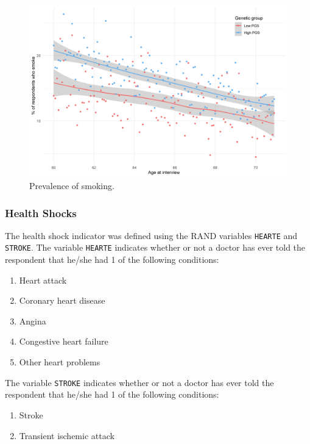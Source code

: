 \begin{figure}[!ht]
	\begin{center}
	\includegraphics[width=.7\textwidth]
	{../3_output/over_time/graph_6070smokenplot_agebypgs.png}
	\caption{Prevalence of smoking.
	\label{fig:smoking}}
	\vspace{-0.8cm}
	\end{center}
\end{figure}


\subsubsection{Health Shocks}
\label{supsec:cv_def}
The health shock indicator was defined using the RAND variables {\tt HEARTE} and {\tt STROKE}. The variable {\tt HEARTE} indicates whether or not a doctor has ever told the respondent that he/she had 1 of the following conditions:
\begin{enumerate}
	\item Heart attack
	\item Coronary heart disease
	\item Angina
	\item Congestive heart failure
	\item Other heart problems\\
\end{enumerate}

The variable {\tt STROKE} indicates whether or not a doctor has ever told the respondent that he/she had 1 of the following conditions:
\begin{enumerate}
	\item Stroke
	\item Transient ischemic attack\\
\end{enumerate}

